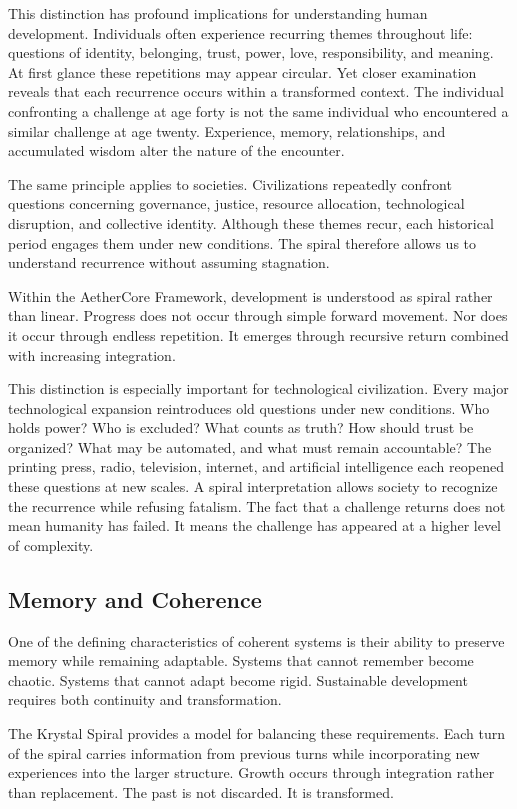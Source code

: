 \documentclass[12pt]{article}
\begin{document}
This distinction has profound implications for understanding human development. Individuals often experience recurring themes throughout life: questions of identity, belonging, trust, power, love, responsibility, and meaning. At first glance these repetitions may appear circular. Yet closer examination reveals that each recurrence occurs within a transformed context. The individual confronting a challenge at age forty is not the same individual who encountered a similar challenge at age twenty. Experience, memory, relationships, and accumulated wisdom alter the nature of the encounter.

The same principle applies to societies. Civilizations repeatedly confront questions concerning governance, justice, resource allocation, technological disruption, and collective identity. Although these themes recur, each historical period engages them under new conditions. The spiral therefore allows us to understand recurrence without assuming stagnation.

Within the AetherCore Framework, development is understood as spiral rather than linear. Progress does not occur through simple forward movement. Nor does it occur through endless repetition. It emerges through recursive return combined with increasing integration.

This distinction is especially important for technological civilization. Every major technological expansion reintroduces old questions under new conditions. Who holds power? Who is excluded? What counts as truth? How should trust be organized? What may be automated, and what must remain accountable? The printing press, radio, television, internet, and artificial intelligence each reopened these questions at new scales. A spiral interpretation allows society to recognize the recurrence while refusing fatalism. The fact that a challenge returns does not mean humanity has failed. It means the challenge has appeared at a higher level of complexity.

\subsection{Memory and Coherence}

One of the defining characteristics of coherent systems is their ability to preserve memory while remaining adaptable. Systems that cannot remember become chaotic. Systems that cannot adapt become rigid. Sustainable development requires both continuity and transformation.

The Krystal Spiral provides a model for balancing these requirements. Each turn of the spiral carries information from previous turns while incorporating new experiences into the larger structure. Growth occurs through integration rather than replacement. The past is not discarded. It is transformed.
\end{document}
